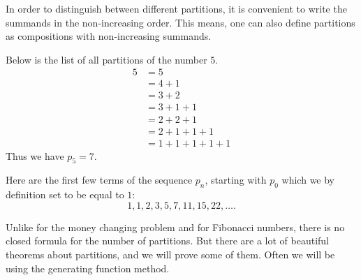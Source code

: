 \begin{page}
\setcounter{section}{3}
\setcounter{subsection}{4}
\setcounter{dfn}{3}
\label{portion:792}

In order to distinguish between different partitions, it is convenient to write the summands in the non-increasing order.
This means, one can also define partitions as compositions with non-increasing summands.


\end{page}

\begin{page}
\setcounter{section}{3}
\setcounter{subsection}{4}
\setcounter{dfn}{4}
\label{portion:794}

\begin{exl}
Below is the list of all partitions of the number $5$.
\begin{align*}
5 &= 5\\
&= 4+1\\
&= 3+2\\
&= 3+1+1\\
&= 2+2+1\\
&= 2+1+1+1\\
&= 1+1+1+1+1
\end{align*}
Thus we have $p_5=7$.
\end{exl}

\end{page}

\begin{page}
\setcounter{section}{3}
\setcounter{subsection}{4}
\setcounter{dfn}{4}
\label{portion:795}


Here are the first few terms of the sequence $p_n$, starting with $p_0$ which we by definition set to be equal to $1$:
\[
1, 1, 2, 3, 5, 7, 11, 15, 22, \ldots.
\]



Unlike for the money changing problem and for Fibonacci numbers, there is no closed formula for the number of partitions.
But there are a lot of beautiful theorems about partitions, and we will prove some of them.
Often we will be using the generating function method.


\end{page}

